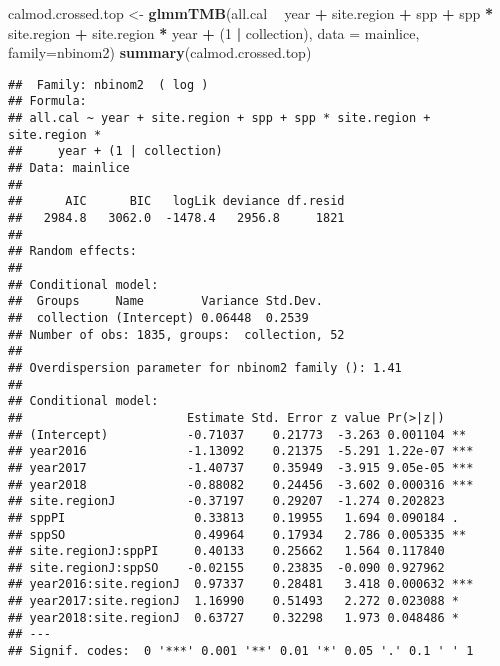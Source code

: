 \documentclass[]{article}
\newenvironment{Shaded}{\begin{snugshade}}{\end{snugshade}}
\newcommand{\KeywordTok}[1]{\textcolor[rgb]{0.13,0.29,0.53}{\textbf{#1}}}
\newcommand{\DataTypeTok}[1]{\textcolor[rgb]{0.13,0.29,0.53}{#1}}
\newcommand{\DecValTok}[1]{\textcolor[rgb]{0.00,0.00,0.81}{#1}}
\newcommand{\StringTok}[1]{\textcolor[rgb]{0.31,0.60,0.02}{#1}}
\newcommand{\OperatorTok}[1]{\textcolor[rgb]{0.81,0.36,0.00}{\textbf{#1}}}
\newcommand{\NormalTok}[1]{#1}
\begin{document}
\begin{Shaded}
\begin{Highlighting}[]
\NormalTok{calmod.crossed.top <-}\StringTok{ }\KeywordTok{glmmTMB}\NormalTok{(all.cal }\OperatorTok{~}\StringTok{ }\NormalTok{year }\OperatorTok{+}\StringTok{ }\NormalTok{site.region }\OperatorTok{+}\StringTok{ }\NormalTok{spp }\OperatorTok{+}\StringTok{ }\NormalTok{spp }\OperatorTok{*}\StringTok{ }\NormalTok{site.region }\OperatorTok{+}\StringTok{ }
\StringTok{                            }\NormalTok{site.region }\OperatorTok{*}\StringTok{ }\NormalTok{year }\OperatorTok{+}\StringTok{ }\NormalTok{(}\DecValTok{1} \OperatorTok{|}\StringTok{ }\NormalTok{collection), }
                          \DataTypeTok{data =}\NormalTok{ mainlice, }\DataTypeTok{family=}\NormalTok{nbinom2)}
\KeywordTok{summary}\NormalTok{(calmod.crossed.top)}
\end{Highlighting}
\end{Shaded}

\begin{verbatim}
##  Family: nbinom2  ( log )
## Formula:          
## all.cal ~ year + site.region + spp + spp * site.region + site.region *  
##     year + (1 | collection)
## Data: mainlice
## 
##      AIC      BIC   logLik deviance df.resid 
##   2984.8   3062.0  -1478.4   2956.8     1821 
## 
## Random effects:
## 
## Conditional model:
##  Groups     Name        Variance Std.Dev.
##  collection (Intercept) 0.06448  0.2539  
## Number of obs: 1835, groups:  collection, 52
## 
## Overdispersion parameter for nbinom2 family (): 1.41 
## 
## Conditional model:
##                       Estimate Std. Error z value Pr(>|z|)    
## (Intercept)           -0.71037    0.21773  -3.263 0.001104 ** 
## year2016              -1.13092    0.21375  -5.291 1.22e-07 ***
## year2017              -1.40737    0.35949  -3.915 9.05e-05 ***
## year2018              -0.88082    0.24456  -3.602 0.000316 ***
## site.regionJ          -0.37197    0.29207  -1.274 0.202823    
## sppPI                  0.33813    0.19955   1.694 0.090184 .  
## sppSO                  0.49964    0.17934   2.786 0.005335 ** 
## site.regionJ:sppPI     0.40133    0.25662   1.564 0.117840    
## site.regionJ:sppSO    -0.02155    0.23835  -0.090 0.927962    
## year2016:site.regionJ  0.97337    0.28481   3.418 0.000632 ***
## year2017:site.regionJ  1.16990    0.51493   2.272 0.023088 *  
## year2018:site.regionJ  0.63727    0.32298   1.973 0.048486 *  
## ---
## Signif. codes:  0 '***' 0.001 '**' 0.01 '*' 0.05 '.' 0.1 ' ' 1
\end{verbatim}
\end{document}
